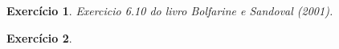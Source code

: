 \documentclass[letter,11pt]{article}
\newtheorem{exer}{Exercício}
\begin{document}
\begin{exer} \rm
Exercicio 6.10 do livro Bolfarine e Sandoval (2001). 
\end{exer}


\begin{exer} \rm
\end{exer}
\end{document}

